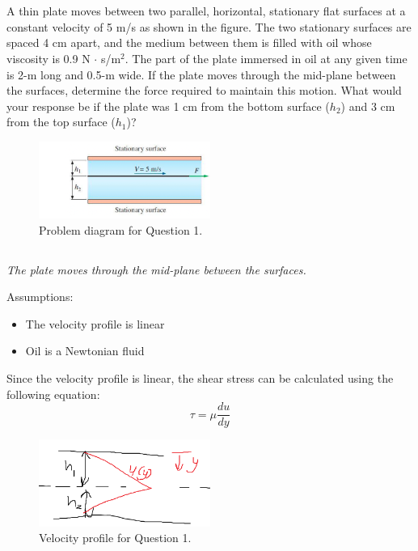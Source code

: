 \section{}
A thin plate moves between two parallel, horizontal, stationary flat 
surfaces at a constant velocity of 5 m/s as shown in the figure. The two 
stationary surfaces are spaced 4 cm apart, and the medium between them is 
filled with oil whose viscosity is 0.9 N $\cdot$ s/m$^2$. The part of the
plate immersed in oil at any given time is 2-m long and 0.5-m wide. If the
plate moves through the mid-plane between the surfaces, determine the force
required to maintain this motion. What would your response be if the plate
was 1 cm from the bottom surface ($h_2$) and 3 cm from the top surface ($h_1$)?
\begin{figure}[h]
    \centering
    \includegraphics[width=0.5\textwidth]{Questions/Figures/Q1ProblemDiagram.png}
    \caption{Problem diagram for Question 1.}
    \label{fig:Q1ProblemDiagram}
\end{figure}

\subsection{}
\textit{The plate moves through the mid-plane between the surfaces.}

Assumptions:
\begin{itemize}
    \item The velocity profile is linear
    \item Oil is a Newtonian fluid
\end{itemize}

Since the velocity profile is linear, the shear stress can be calculated using
the following equation:
\begin{equation}
    \tau = \mu \frac{du}{dy}
    \label{eq:ShearStress}
\end{equation}

\begin{figure}[h]
    \centering
    \includegraphics[width=0.5\textwidth]{Questions/Figures/Q1LinearVelocityProfile.png}
    \caption{Velocity profile for Question 1.}
    \label{fig:Q1VelocityProfile}
\end{figure}

